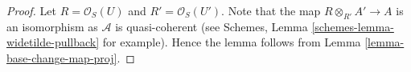\documentclass{stacks-project}
\theoremstyle{plain}
\theoremstyle{definition}
\theoremstyle{remark}
\numberwithin{equation}{subsection}
\begin{document}
\begin{proof}
Let $R = \mathcal{O}_S(U)$ and $R' = \mathcal{O}_S(U')$.
Note that the map $R \otimes_{R'} A' \to A$ is an isomorphism as
$\mathcal{A}$ is quasi-coherent
(see Schemes, Lemma \ref{schemes-lemma-widetilde-pullback} for example).
Hence the lemma follows from
Lemma \ref{lemma-base-change-map-proj}.
\end{proof}
\end{document}
